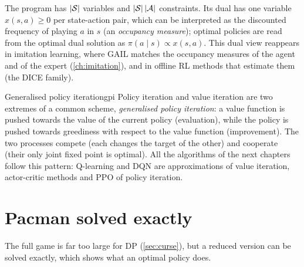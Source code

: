 The program has $\left\lvert \mathcal{S} \right\rvert$ variables and $\left\lvert \mathcal{S} \right\rvert
\left\lvert \mathcal{A} \right\rvert$ constraints. Its dual has one variable $x(s, a) \geq 0$ per
state-action pair, which can be interpreted as the discounted frequency of
playing $a$ in $s$ (an \emph{occupancy measure}); optimal policies are read
from the optimal dual solution as $\pi(a \mid s) \propto x(s, a)$. This
dual view reappears in imitation learning, where GAIL matches the
occupancy measures of the agent and of the expert (\cref{ch:imitation}),
and in offline RL methods that estimate them (the DICE family).

\begin{remark}{Generalised policy iteration}{gpi}
  Policy iteration and value iteration are two extremes of a common scheme,
  \emph{generalised policy iteration}: a value function is pushed towards
  the value of the current policy (evaluation), while the policy is pushed
  towards greediness with respect to the value function (improvement). The
  two processes compete (each changes the target of the other) and
  cooperate (their only joint fixed point is optimal). All the algorithms of
  the next chapters follow this pattern: Q-learning and DQN are
  approximations of value iteration, actor-critic methods and PPO of
  policy iteration.
\end{remark}

\section{Pacman solved exactly}
\label{sec:dp-pacman}

The full game is far too large for DP (\cref{sec:curse}), but a reduced
version can be solved exactly, which shows what an optimal policy does.

